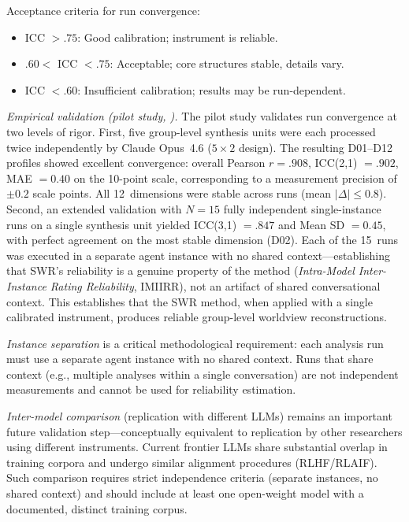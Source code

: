 \documentclass[11pt,a4paper]{article}
\theoremstyle{definition}
\theoremstyle{plain}
\theoremstyle{remark}
\begin{document}
Acceptance criteria for run convergence:
\begin{itemize}[leftmargin=*]
  \item ICC $> .75$: Good calibration; instrument is reliable.
  \item $.60 < $ ICC $< .75$: Acceptable; core structures stable, details vary.
  \item ICC $< .60$: Insufficient calibration; results may be run-dependent.
\end{itemize}

\emph{Empirical validation (pilot study, \citealp{Geiger2026b}).} The pilot study validates run convergence at two levels of rigor. First, five group-level synthesis units were each processed twice independently by Claude Opus~4.6 ($5 \times 2$ design). The resulting D01--D12 profiles showed excellent convergence: overall Pearson $r = .908$, ICC(2,1) $= .902$, MAE $= 0.40$ on the 10-point scale, corresponding to a measurement precision of $\pm 0.2$ scale points. All 12~dimensions were stable across runs (mean $|\Delta| \leq 0.8$). Second, an extended validation with $N = 15$ fully independent single-instance runs on a single synthesis unit yielded ICC(3,1) $= .847$ and Mean SD $= 0.45$, with perfect agreement on the most stable dimension (D02). Each of the 15~runs was executed in a separate agent instance with no shared context---establishing that SWR's reliability is a genuine property of the method (\emph{Intra-Model Inter-Instance Rating Reliability}, IMIIRR), not an artifact of shared conversational context. This establishes that the SWR method, when applied with a single calibrated instrument, produces reliable group-level worldview reconstructions.

\emph{Instance separation} is a critical methodological requirement: each analysis run must use a separate agent instance with no shared context. Runs that share context (e.g., multiple analyses within a single conversation) are not independent measurements and cannot be used for reliability estimation.

\emph{Inter-model comparison} (replication with different LLMs) remains an important future validation step---conceptually equivalent to replication by other researchers using different instruments. Current frontier LLMs share substantial overlap in training corpora and undergo similar alignment procedures (RLHF/RLAIF). Such comparison requires strict independence criteria (separate instances, no shared context) and should include at least one open-weight model with a documented, distinct training corpus.
\end{document}
